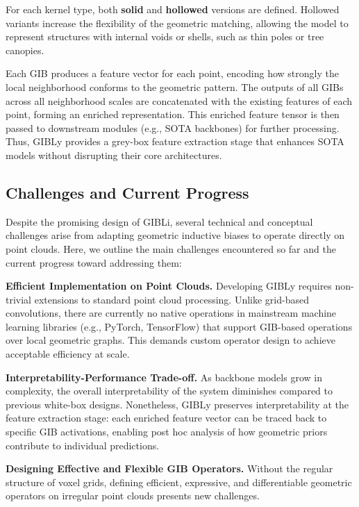 For each kernel type, both \textbf{solid} and \textbf{hollowed} versions are
defined. Hollowed variants increase the flexibility of the geometric matching,
allowing the model to represent structures with internal voids or shells, such
as thin poles or tree canopies.

Each GIB produces a feature vector for each point, encoding how strongly the
local neighborhood conforms to the geometric pattern. The outputs of all GIBs
across all neighborhood scales are concatenated with the existing features of
each point, forming an enriched representation.
%
This enriched feature tensor is then passed to downstream modules (e.g., SOTA
backbones) for further processing. Thus, GIBLy provides a grey-box feature
extraction stage that enhances SOTA models without disrupting their core
architectures.

\subsection{Challenges and Current Progress}

Despite the promising design of GIBLi, several technical and conceptual
challenges arise from adapting geometric inductive biases to operate directly
on point clouds. Here, we outline the main challenges encountered so far and
the current progress toward addressing them:

\textbf{Efficient Implementation on Point Clouds.} \;
Developing GIBLy requires non-trivial extensions to standard point cloud processing.
Unlike grid-based convolutions, there are currently no native operations in
mainstream machine learning libraries (e.g., PyTorch, TensorFlow) that support
GIB-based operations over local geometric graphs. This demands custom operator
design to achieve acceptable efficiency at scale.

\textbf{Interpretability-Performance Trade-off.} \;
As backbone models grow in complexity, the overall interpretability of the
system diminishes compared to previous white-box designs.
Nonetheless, GIBLy preserves interpretability at the feature extraction stage:
each enriched feature vector can be traced back to specific GIB activations,
enabling post hoc analysis of how geometric priors contribute to individual predictions.

\textbf{Designing Effective and Flexible GIB Operators.} \;
Without the regular structure of voxel grids, defining efficient, expressive,
and differentiable geometric operators on irregular point clouds presents new
challenges.


